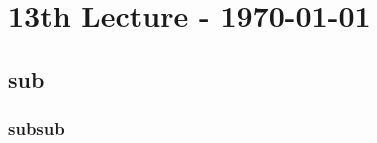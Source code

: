 \documentclass{article}
\begin{document}
	\newpage
	
	\section{13th Lecture - \today}
	\begin{adjustwidth}{2em}{2em}
		\subsection{sub}
		\begin{adjustwidth}{2em}{2em}
			\subsubsection{subsub}
			\begin{adjustwidth}{2em}{}
			\end{adjustwidth}
		\end{adjustwidth}
	\end{adjustwidth}
\end{document}
